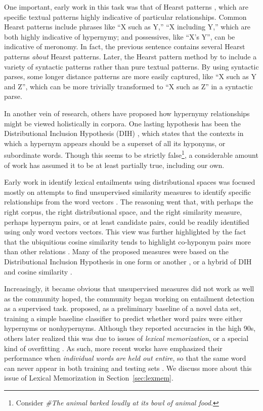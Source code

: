 \documentclass[letterpaper]{article}
\begin{document}
One important, early work in this task was that of Hearst patterns
\cite{hearst:1992:coling}, which are specific textual patterns highly
indicative of particular relationships. Common Hearst patterns include
phrases like ``X such as Y,'' ``X including Y,'' which are both highly
indicative of hypernymy; and possessives, like ``X's Y'', can be indicative
of meronomy. In fact, the previous sentence contains several Hearst patterns
{\em about} Hearst patterns. Later, the Hearst pattern method by
 to include a variety of syntactic patterns rather than
pure textual patterns. By using syntactic parses, some longer distance patterns
are more easily captured, like ``X such as Y and Z'', which can be more
trivially transformed to ``X such as Z'' in a syntactic parse.

In another vein of research, others have proposed how
hypernymy relationships might be viewed holistically in corpora.
One lasting hypothesis has been the Distributional Inclusion Hypothesis (DIH)
\cite{zhitomirsky-geffet:2005:acl}, which states that the contexts in which a
hypernym appears should be a superset of all its hyponyms, or subordinate
words. Though this seems to be strictly false\footnote{Consider {\em \#The
animal barked loudly at its bowl of animal food.}}, a considerable amount of
work has assumed it to be at least partially true, including our own.

Early work in identify lexical entailments using distributional spaces was
focused mostly on attempts to find unsupervised similarity measures to identify
specific relationships from the word vectors
\cite{weeds:2004:coling,clarke:2009:gems,kotlerman:2010:nle,lenci:2012:starsem,santus:2013:thesis}.
The reasoning went that, with perhaps the right corpus, the right
distributional space, and the right similarity measure, perhaps hypernym pairs,
or at least candidate pairs, could be readily identified using only word
vectors vectors. This view was further highlighted by the fact that the
ubiquitious cosine similarity tends to highlight co-hyponym pairs more than
other relations \cite{baroni:2011:gems}. Many of the proposed measures were
based on the Distributional Inclusion Hypothesis in one form or another
\cite{clarke:2009:gems}, or a hybrid of DIH and cosine similarity
\cite{kotlerman:2010:nle,lenci:2012:starsem}.

Increasingly, it became obvious that unsupervised measures did not work
as well as the community hoped, the community began working
on entailment detection as a supervised task. 
proposed, as a preliminary baseline of a novel data set, training a simple
baseline classifier to predict whether word pairs were either hypernyms or
nonhypernyms. Although they reported accuracies in the high 90s, others later
realized this was due to issues of {\em lexical memorization}, or a special
kind of overfitting
\cite{roller:2014:coling,weeds:2014:coling,levy:2015:naacl}. As such, more
recent works have emphasized their performance when {\em individual words are
held out entire}, so that the same word can never appear in both training and
testing sets \cite{roller:2014:coling,kruszewski:2015:tacl,levy:2015:naacl}.
We discuss more about this issue of Lexical Memorization in
Section~\ref{sec:lexmem}.
\end{document}
